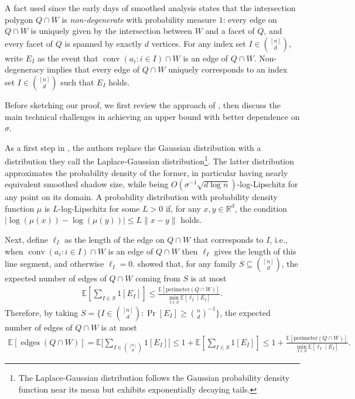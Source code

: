 \documentclass{article}\usepackage[a4paper,margin=20mm]{geometry}
\newcommand{\R}{\mathbb R}
\newcommand{\E}{\mathbb E}
\newcommand{\conv}{\operatorname{conv}}
\newcommand{\edges}{\operatorname{edges}}
\begin{document}
A fact used since the early days of smoothed analysis \cite{ST04} states that the intersection polygon $Q \cap W$ is \emph{non-degenerate} with probability measure $1$:
every edge on $Q \cap W$ is uniquely given by the intersection between $W$ and a facet of $Q$,
and every facet of $Q$ is spanned by exactly $d$ vertices.
For any index set $I \in \binom{[n]}{d}$, write $E_I$ as the event that $\conv(a_i : i\in I) \cap W$ is an edge of $Q \cap W$.
Non-degeneracy implies that every edge of $Q \cap W$ uniquely corresponds to an index set $I \in \binom{[n]}{d}$ such that $E_I$ holds.


Before sketching our proof, we first review the approach of \cite{DH18}, then discuss the main technical challenges in achieving an upper bound with better dependence on $\sigma$.

As a first step in \cite{DH18}, the authors replace the Gaussian distribution with a distribution they call the
Laplace-Gaussian distribution\footnote{The Laplace-Gaussian distribution follows the Gaussian probability density function near its mean but exhibits exponentially decaying tails.}.
 The latter distribution approximates the probability density of the former, in
 particular having nearly equivalent smoothed shadow size, while being
$O(\sigma^{-1}\sqrt{d\log n})$-log-Lipschitz for any point on its domain.
A probability distribution with probability density function $\mu$ is
$L$-log-Lipschitz for some $L > 0$ if, for any $x, y\in \R^d$, the condition
$|\log(\mu(x)) - \log(\mu(y))| \leq L\|x - y\|$ holds.


Next, define $\ell_I$ as the length of the edge on $Q \cap W$ that corresponds to $I$, i.e., when $\conv(a_i : i\in I) \cap W$ is an edge of $Q \cap W$ then $\ell_I$ gives the length of this line segment, and otherwise $\ell_I = 0$.
\cite{DH18} showed that, for any family $S \subseteq \binom{[n]}{d}$,
the expected number of edges of $Q \cap W$ coming from $S$ is at most
\begin{align}
    \E\left[\sum_{I \in S} 1[E_I]\right] \leq \frac{\E[\mathrm{perimeter}(Q \cap W)]}{\min_{I \in S} \E[\ell_I \mid E_I]}.
    \label{eq:counting-strategy-length}
\end{align}
Therefore, by taking $S = \{I \in\binom{[n]}{d}: \Pr[E_I] \geq \binom n d ^{-1}\}$, the expected number of edges of $Q \cap W$ is at most
\begin{align}
\E[\edges(Q \cap W)] = \E\Bigg[\sum_{I \in \binom{[n]}{d}} 1[E_I]\Bigg] \leq 1 + \E\left[\sum_{I \in S} 1[E_I]\right] \leq 1 + \frac{\E[\mathrm{perimeter}(Q \cap W)]}{\min_{I \in S} \E[\ell_I \mid E_I]}.
    \label{eq:counting-strategy-old}
\end{align}
\end{document}
